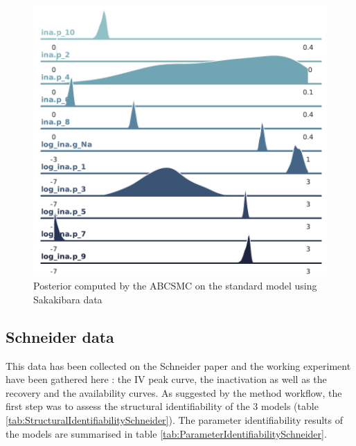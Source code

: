 \documentclass[11pt]{report}
\begin{document}
\begin{figure}[H]
    \centering
    \begin{measuredfigure}
    \includegraphics[scale =0.5]{figures/Ina_Simple_saka/inaStandardPosterior_all_exp_saka.PNG}
    \captionsetup{singlelinecheck = false, format= hang, justification=centerlast, labelsep=space}
	\caption{Posterior computed by the ABCSMC on the standard model using Sakakibara data \cite{Sakakibara1992}}
	\end{measuredfigure}
      \addtocounter{figure}{-1}
	\label{fig:InaPosteriorStandardSaka}
\end{figure}

\subsection{Schneider \cite{Schneider1994} data}

This data has been collected on the Schneider \cite{Schneider1994} paper and the working experiment have been gathered here : the IV peak curve, the inactivation as well as the recovery and the availability curves. As suggested by the method workflow, the first step was to assess the structural identifiability of the 3 models (table \ref{tab:StructuralIdentifiabilitySchneider}). The parameter identifiability results of the models are summarised in table \ref{tab:ParameterIdentifiabilitySchneider}.
\end{document}
